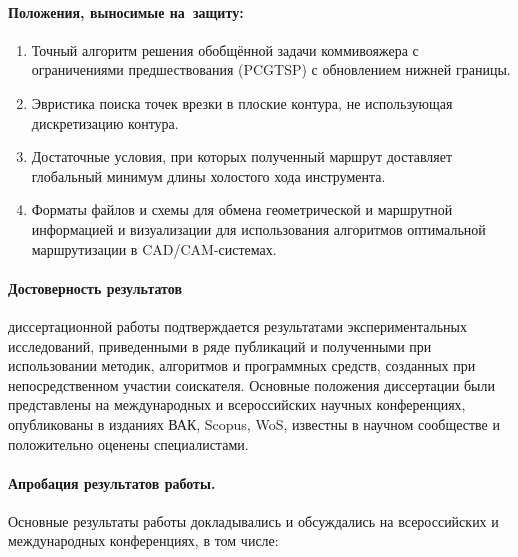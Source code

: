 \paragraph*{Положения, выносимые на~защиту:}

\begin{enumerate}
  \item
    Точный алгоритм решения обобщённой задачи коммивояжера
    с ограничениями предшествования
    (PCGTSP)
    с обновлением нижней границы.
  \item
    Эвристика поиска точек врезки в плоские контура,
    не использующая дискретизацию контура.
  \item
    Достаточные условия, при которых полученный маршрут
    доставляет глобальный минимум длины холостого хода инструмента.
  \item
    Форматы файлов и схемы для обмена геометрической и маршрутной информацией
    и визуализации для использования алгоритмов оптимальной маршрутизации
    в CAD/CAM-системах.
\end{enumerate}

\paragraph*{Достоверность результатов}
диссертационной работы подтверждается результатами экспериментальных исследований,
приведенными в ряде публикаций и полученными при использовании методик, алгоритмов и программных средств,
созданных при непосредственном участии соискателя.
Основные положения диссертации были представлены на международных и всероссийских научных конференциях,
опубликованы в изданиях ВАК, Scopus, WoS,
известны в научном сообществе и положительно оценены специалистами.

\paragraph*{Апробация результатов работы.}
Основные результаты работы докладывались и обсуждались на всероссийских и международных конференциях, в том числе:

